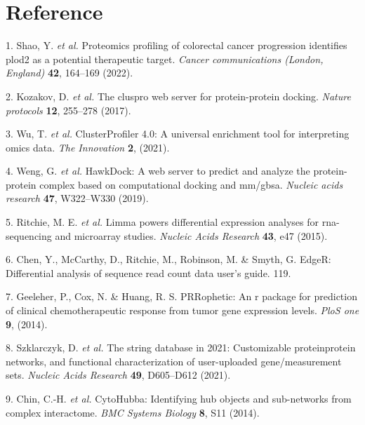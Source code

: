 \documentclass[
]{article}
\newenvironment{cslreferences}%
  {}%
  {\par}
\begin{document}
\hypertarget{bibliography}{%
\section*{Reference}\label{bibliography}}

\hypertarget{refs}{}
\begin{cslreferences}
\leavevmode\hypertarget{ref-ProteomicsProfShao2022}{}%
1. Shao, Y. \emph{et al.} Proteomics profiling of colorectal cancer progression identifies plod2 as a potential therapeutic target. \emph{Cancer communications (London, England)} \textbf{42}, 164--169 (2022).

\leavevmode\hypertarget{ref-TheClusproWebKozako2017}{}%
2. Kozakov, D. \emph{et al.} The cluspro web server for protein-protein docking. \emph{Nature protocols} \textbf{12}, 255--278 (2017).

\leavevmode\hypertarget{ref-ClusterprofilerWuTi2021}{}%
3. Wu, T. \emph{et al.} ClusterProfiler 4.0: A universal enrichment tool for interpreting omics data. \emph{The Innovation} \textbf{2}, (2021).

\leavevmode\hypertarget{ref-HawkdockAWebWeng2019}{}%
4. Weng, G. \emph{et al.} HawkDock: A web server to predict and analyze the protein-protein complex based on computational docking and mm/gbsa. \emph{Nucleic acids research} \textbf{47}, W322--W330 (2019).

\leavevmode\hypertarget{ref-LimmaPowersDiRitchi2015}{}%
5. Ritchie, M. E. \emph{et al.} Limma powers differential expression analyses for rna-sequencing and microarray studies. \emph{Nucleic Acids Research} \textbf{43}, e47 (2015).

\leavevmode\hypertarget{ref-EdgerDifferenChen}{}%
6. Chen, Y., McCarthy, D., Ritchie, M., Robinson, M. \& Smyth, G. EdgeR: Differential analysis of sequence read count data user's guide. 119.

\leavevmode\hypertarget{ref-PrropheticAnGeeleh2014}{}%
7. Geeleher, P., Cox, N. \& Huang, R. S. PRRophetic: An r package for prediction of clinical chemotherapeutic response from tumor gene expression levels. \emph{PloS one} \textbf{9}, (2014).

\leavevmode\hypertarget{ref-TheStringDataSzklar2021}{}%
8. Szklarczyk, D. \emph{et al.} The string database in 2021: Customizable proteinprotein networks, and functional characterization of user-uploaded gene/measurement sets. \emph{Nucleic Acids Research} \textbf{49}, D605--D612 (2021).

\leavevmode\hypertarget{ref-CytohubbaIdenChin2014}{}%
9. Chin, C.-H. \emph{et al.} CytoHubba: Identifying hub objects and sub-networks from complex interactome. \emph{BMC Systems Biology} \textbf{8}, S11 (2014).


\end{cslreferences}
\end{document}
